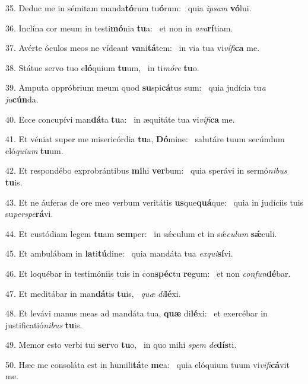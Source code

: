 35. Deduc me in sémitam manda\textbf{tó}rum tu\textbf{ó}rum: \ast\  quia \textit{ip}\textit{sam} \textbf{vó}lui.\

36. Inclína cor meum in testi\textbf{mó}nia \textbf{tu}a: \ast\  et non in \textit{a}\textit{va}\textbf{rí}tiam.\

37. Avérte óculos meos ne vídeant \textbf{va}ni\textbf{tá}tem: \ast\  in via tua vi\textit{ví}\textit{fi}\textbf{ca} me.\

38. Státue servo tuo e\textbf{ló}quium \textbf{tu}um, \ast\  in ti\textit{mó}\textit{re} \textbf{tu}o.\

39. Amputa oppróbrium meum quod \textbf{su}spi\textbf{cá}tus sum: \ast\  quia judícia tu\textit{a} \textit{ju}\textbf{cún}da.\

40. Ecce concupívi man\textbf{dá}ta \textbf{tu}a: \ast\  in æquitáte tua vi\textit{ví}\textit{fi}\textbf{ca} me.\

41. Et véniat super me misericórdia \textbf{tu}a, \textbf{Dó}mine: \ast\  salutáre tuum secúndum eló\textit{qui}\textit{um} \textbf{tu}um.\

42. Et respondébo exprobrántibus \textbf{mi}hi \textbf{ver}bum: \ast\  quia sperávi in sermó\textit{ni}\textit{bus} \textbf{tu}is.\

43. Et ne áuferas de ore meo verbum veritátis \textbf{us}que\textbf{quá}que: \ast\  quia in judíciis tuis su\textit{per}\textit{spe}\textbf{rá}vi.\

44. Et custódiam legem \textbf{tu}am \textbf{sem}per: \ast\  in sǽculum et in sǽ\textit{cu}\textit{lum} \textbf{sǽ}culi.\

45. Et ambulábam in \textbf{la}ti\textbf{tú}dine: \ast\  quia mandáta tua \textit{ex}\textit{qui}\textbf{sí}vi.\

46. Et loquébar in testimóniis tuis in con\textbf{spéc}tu \textbf{re}gum: \ast\  et non \textit{con}\textit{fun}\textbf{dé}bar.\

47. Et meditábar in man\textbf{dá}tis \textbf{tu}is, \ast\  \textit{quæ} \textit{di}\textbf{lé}xi.\

48. Et levávi manus meas ad mandáta tua, \textbf{quæ} di\textbf{lé}xi: \ast\  et exercébar in justificatió\textit{ni}\textit{bus} \textbf{tu}is.\

49. Memor esto verbi tui \textbf{ser}vo \textbf{tu}o, \ast\  in quo mihi \textit{spem} \textit{de}\textbf{dís}ti.\

50. Hæc me consoláta est in humili\textbf{tá}te \textbf{me}a: \ast\  quia elóquium tuum vi\textit{vi}\textit{fi}\textbf{cá}vit me.\

